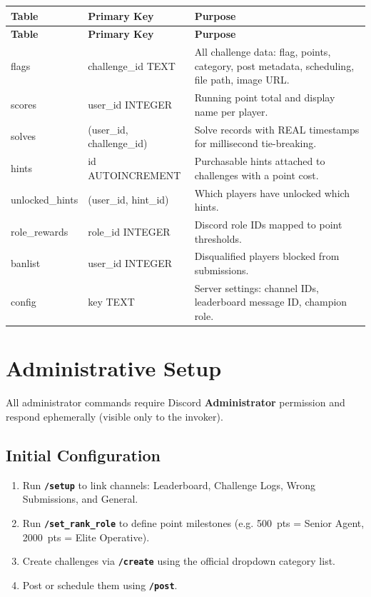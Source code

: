 \documentclass[12pt,a4paper]{report}
\newcommand{\cmd}[1]{\texttt{\color{cybercyan}\textbf{#1}}}
\begin{document}
\begin{longtable}{>{\ttfamily}p{3.4cm} p{3.2cm} p{6cm}}
\toprule
\textbf{Table} & \textbf{Primary Key} & \textbf{Purpose} \\
\midrule
\endfirsthead
\toprule
\textbf{Table} & \textbf{Primary Key} & \textbf{Purpose} \\
\midrule
\endhead
flags           & challenge\_id TEXT        & All challenge data: flag, points, category, post metadata, scheduling, file path, image URL. \\[0.3cm]
scores          & user\_id INTEGER          & Running point total and display name per player. \\[0.3cm]
solves          & (user\_id, challenge\_id) & Solve records with REAL timestamps for millisecond tie-breaking. \\[0.3cm]
hints           & id AUTOINCREMENT          & Purchasable hints attached to challenges with a point cost. \\[0.3cm]
unlocked\_hints & (user\_id, hint\_id)      & Which players have unlocked which hints. \\[0.3cm]
role\_rewards   & role\_id INTEGER          & Discord role IDs mapped to point thresholds. \\[0.3cm]
banlist         & user\_id INTEGER          & Disqualified players blocked from submissions. \\[0.3cm]
config          & key TEXT                  & Server settings: channel IDs, leaderboard message ID, champion role. \\
\bottomrule
\end{longtable}

\chapter{Administrative Setup}

All administrator commands require Discord \textbf{Administrator} permission and respond ephemerally
(visible only to the invoker).

\section{Initial Configuration}

\begin{enumerate}
    \item Run \cmd{/setup} to link channels: Leaderboard, Challenge Logs, Wrong Submissions, and General.
    \item Run \cmd{/set\_rank\_role} to define point milestones (e.g. 500~pts = Senior Agent,
          2000~pts = Elite Operative).
    \item Create challenges via \cmd{/create} using the official dropdown category list.
    \item Post or schedule them using \cmd{/post}.
\end{enumerate}
\end{document}
